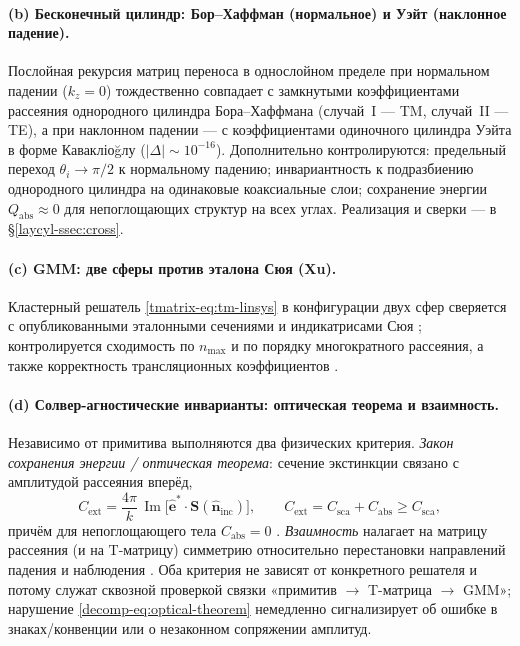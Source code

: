 \documentclass[11pt,a4paper]{article}
\begin{document}
\paragraph{(b) Бесконечный цилиндр: Бор--Хаффман (нормальное) и Уэйт (наклонное падение).}
Послойная рекурсия матриц переноса в однослойном пределе при нормальном падении ($k_z=0$) тождественно совпадает с замкнутыми коэффициентами рассеяния однородного цилиндра Бора--Хаффмана \cite{bohren1983} (случай~I --- TM, случай~II --- TE), а при наклонном падении --- с коэффициентами одиночного цилиндра Уэйта \cite{wait1955} в форме Кавакліоğлу \cite{kavaklioglu2008} ($|\Delta|\sim10^{-16}$). Дополнительно контролируются: предельный переход $\theta_i\to\pi/2$ к нормальному падению; инвариантность к подразбиению однородного цилиндра на одинаковые коаксиальные слои; сохранение энергии $Q_{\mathrm{abs}}\approx0$ для непоглощающих структур на всех углах. Реализация и сверки --- в \S\ref{laycyl-ssec:cross}.

\paragraph{(c) GMM: две сферы против эталона Сюя (Xu).}
Кластерный решатель \eqref{tmatrix-eq:tm-linsys} в конфигурации двух сфер сверяется с опубликованными эталонными сечениями и индикатрисами Сюя \cite{xu1995}; контролируется сходимость по $n_{\max}$ и по порядку многократного рассеяния, а также корректность трансляционных коэффициентов \cite{stein1961,cruzan1962}.

\paragraph{(d) Солвер-агностические инварианты: оптическая теорема и взаимность.}
Независимо от примитива выполняются два физических критерия. \emph{Закон сохранения энергии / оптическая теорема}: сечение экстинкции связано с амплитудой рассеяния вперёд,
\begin{equation}
C_{\mathrm{ext}} = \frac{4\pi}{k}\,\operatorname{Im}\bigl[\hat{\bm{e}}^{*}\!\cdot\bm{S}(\hat{\bm{n}}_{\mathrm{inc}})\bigr],
\qquad C_{\mathrm{ext}} = C_{\mathrm{sca}} + C_{\mathrm{abs}} \ge C_{\mathrm{sca}},
\label{decomp-eq:optical-theorem}
\end{equation}
причём для непоглощающего тела $C_{\mathrm{abs}}=0$ \cite{bohren1983,mishchenko2002}. \emph{Взаимность} налагает на матрицу рассеяния (и на T-матрицу) симметрию относительно перестановки направлений падения и наблюдения \cite{mishchenko2002,waterman1971}. Оба критерия не зависят от конкретного решателя и потому служат сквозной проверкой связки «примитив $\to$ T-матрица $\to$ GMM»; нарушение \eqref{decomp-eq:optical-theorem} немедленно сигнализирует об ошибке в знаках/конвенции или о незаконном сопряжении амплитуд.
\end{document}
